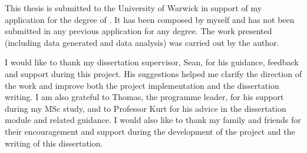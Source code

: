 \frontmatter


\tableofcontents
\clearforchapter\listoffigures


This thesis is submitted to the University of Warwick in support of my application for the degree of \thequalification. It has been composed by myself and has not been submitted in any previous application for any degree.
The work presented (including data generated and data analysis) was carried out by the author.




I would like to thank my dissertation supervisor, Sean, for his guidance, feedback and support during this project. His suggestions helped me clarify the direction of the work and improve both the project implementation and the dissertation writing. I am also grateful to Thomas, the programme leader, for his support during my MSc study, and to Professor Kurt for his advice in the dissertation module and related guidance. I would also like to thank my family and friends for their encouragement and support during the development of the project and the writing of this dissertation.

